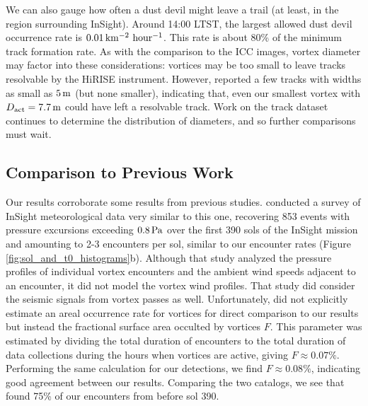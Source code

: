 \documentclass[linenumbers,trackchanges]{aastex63}
\begin{document}
We can also gauge how often a dust devil might leave a trail (at least, in the region surrounding InSight). Around 14:00 LTST, the largest allowed dust devil occurrence rate is $0.01\,{\rm km^{-2}\ hour^{-1}}$. This rate is about 80\% of the minimum track formation rate. As with the comparison to the ICC images, vortex diameter may factor into these considerations: vortices may be too small to leave tracks resolvable by the HiRISE instrument. However, \citet{2020GeoRL..4787234P} reported a few tracks with widths as small as $5\,{\rm m}$ (but none smaller), indicating that, even our smallest vortex with $D_{\rm act} = 7.7\,{\rm m}$ could have left a resolvable track. Work on the track dataset continues to determine the distribution of diameters, and so further comparisons must wait.

\subsection{Comparison to Previous Work}
\label{sec:Comparison to Previous Work}

Our results corroborate some results from previous studies. \citet{2021Icar..35514119L} conducted a survey of InSight meteorological data very similar to this one, recovering 853 events with pressure excursions exceeding $0.8\,{\rm Pa}$ over the first 390 sols of the InSight mission and amounting to 2-3 encounters per sol, similar to our encounter rates (Figure \ref{fig:sol_and_t0_histograms}b). Although that study analyzed the pressure profiles of individual vortex encounters and the ambient wind speeds adjacent to an encounter, it did not model the vortex wind profiles. That study did consider the seismic signals from vortex passes as well. Unfortunately, \citet{2021Icar..35514119L} did not explicitly estimate an areal occurrence rate for vortices for direct comparison to our results but instead the fractional surface area occulted by vortices $F$. This parameter was estimated by dividing the total duration of encounters to the total duration of data collections during the hours when vortices are active, giving $F \approx 0.07\%$. Performing the same calculation for our detections, we find $F \approx 0.08\%$, indicating good agreement between our results. Comparing the two catalogs, we see that \citet{2021Icar..35514119L} found 75\% of our encounters from before sol 390.

\end{document}
